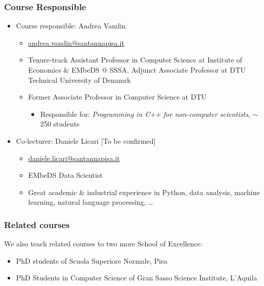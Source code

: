 \documentclass{beamer}%
\begin{document}
\begin{frame}
\frametitle{Course Responsible}
 \begin{itemize}
   \item Course responsible: Andrea Vandin
	\begin{itemize}
      \item\href{mailto:andrea.vandin@santannapisa.it}{\color{blue}andrea.vandin@santannapisa.it}
	  \item Tenure-track Assistant Professor in Computer Science at Institute of Economics \& EMbeDS @ SSSA, Adjunct Associate Professor at DTU Technical University of Denamrk
	  \item Former Associate Professor in Computer Science at DTU
	  \begin{itemize}
      \item 
	   {\scriptsize Responsible for: \emph{Programming in C++ for non-computer scientists}, $\sim$250 students}
	  \end{itemize}
    \end{itemize}
      \item Co-lecturer: Daniele Licari [To be confirmed]
	\begin{itemize}
	\item \href{mailto:daniele.licari@santannapisa.it}{\color{blue}daniele.licari@santannapisa.it}
	\item EMbeDS Data Scientist 
	\item Great academic \& industrial experience in Python, data analysis, machine learning, natural language processing, \ldots
	\end{itemize}
	\end{itemize}
\end{frame}

\begin{frame}
	\frametitle{Related courses}
	We also teach related courses to two more School of Excellence:
		\begin{itemize}
			\item PhD students of Scuola Superiore Normale, Pisa
			\item PhD Students in Computer Science of Gran Sasso Science Institute, L'Aquila
		\end{itemize}
\end{frame}
\end{document}
